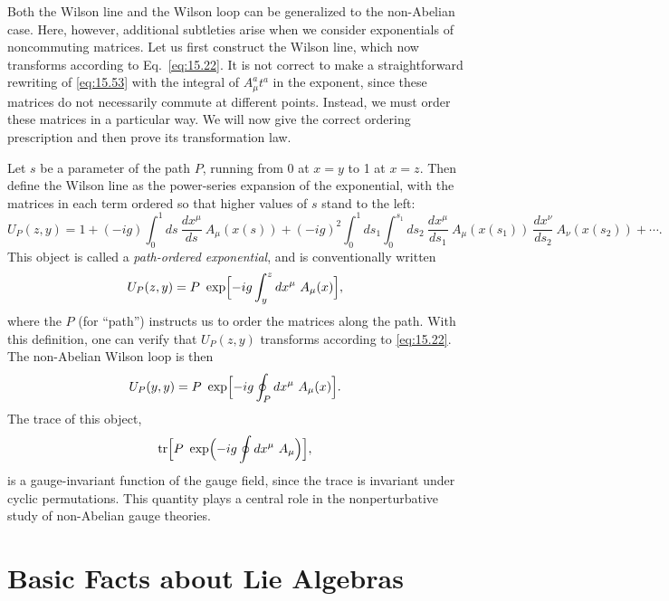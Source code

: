 Both the Wilson line and the Wilson loop can be generalized to the
non-Abelian case.  Here, however, additional subtleties arise when we consider
exponentials of noncommuting matrices.  Let us first construct the Wilson
line, which now transforms according to Eq.~\eqref{eq:15.22}.  It is not
correct to make a straightforward rewriting of \eqref{eq:15.53} with the
integral of $A_\mu^a t^a$ in the exponent, since these matrices do not
necessarily commute at different points.  Instead, we must order these
matrices in a particular way.  We will now give the correct ordering
prescription and then prove its transformation law.

Let $s$ be a parameter of the path $P$, running from 0 at $x=y$ to 1 at
$x=z$.  Then define the Wilson line as the power-series expansion of the
exponential, with the matrices in each term ordered so that higher values of
$s$ stand to the left:
\begin{equation}
  U_P(z,y) = 1 + (-ig)\int_0^1 ds\ \frac{dx^\mu}{ds}\ A_\mu(x(s))
    + (-ig)^2\int_0^1 ds_1\int_0^{s_1} ds_2\ \frac{dx^\mu}{ds_1}\ A_\mu(x(s_1))
      \ \frac{dx^\nu}{ds_2}\ A_\nu(x(s_2)) + \cdots .
  \label{eq:15.56}
\end{equation}
This object is called a \emph{path-ordered exponential}, and is conventionally
written
\begin{equation}
  U_P(z,y) = P\ \exp\Bigl[ -ig\int_y^z dx^\mu\ A_\mu(x) \Bigr] ,
  \label{eq:15.57}
\end{equation}
where the $P$ (for ``path'') instructs us to order the matrices along the
path.  With this definition, one can verify that $U_P(z,y)$ transforms
according to \eqref{eq:15.22}.  The non-Abelian Wilson loop is then
\begin{equation}
  U_P(y,y) = P\ \exp\Bigl[ -ig\oint_P dx^\mu\ A_\mu(x) \Bigr] .
  \label{eq:15.58}
\end{equation}
The trace of this object,
\begin{equation}
  \mathrm{tr}\Bigl[ P\ \exp\Bigl( -ig\oint dx^\mu\ A_\mu \Bigr) \Bigr],
\end{equation}
is a gauge-invariant function of the gauge field, since the trace is invariant
under cyclic permutations.  This quantity plays a central role in the
nonperturbative study of non-Abelian gauge theories.

\section{Basic Facts about Lie Algebras}

